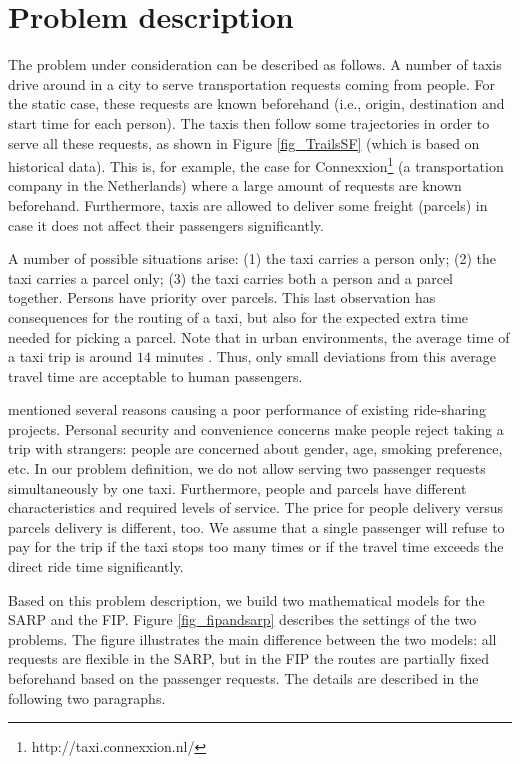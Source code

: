 \documentclass[preprint,authoryear,12pt]{elsarticle}
\begin{document}
\section{Problem description}\label{sec_problem}
The problem under consideration can be described as follows. A number of taxis drive around in a city to serve transportation requests coming from people. For the static case, these requests are known beforehand (i.e., origin, destination and start time for each person). The taxis then follow some trajectories in order to serve all these requests, as shown in Figure \ref{fig_TrailsSF} (which is based on historical data). This is, for example, the case for Connexxion\footnote{http://taxi.connexxion.nl/} (a transportation company in the Netherlands) where a large amount of requests are known beforehand. Furthermore, taxis are allowed to deliver some freight (parcels) in case it does not affect their passengers significantly. 

A number of possible situations arise: (1) the taxi carries a person only; (2) the taxi carries a parcel only; (3) the taxi carries both a person and a parcel together. Persons have priority over parcels. This last observation has consequences for the routing of a taxi, but also for the expected extra time needed for picking a parcel. Note that in urban environments, the average time of a taxi trip is around $14$ minutes \citep{TaxiSFOnline}. Thus, only small deviations from this average travel time are acceptable to human passengers. 

\cite{Kamar} mentioned several reasons causing a poor performance of existing ride-sharing projects. Personal security and convenience concerns make people reject taking a trip with strangers: people are concerned about gender, age, smoking preference, etc. In our problem definition, we do not allow serving two passenger requests simultaneously by one taxi. Furthermore, people and parcels have different characteristics and required levels of service. The price for people delivery versus parcels delivery is different, too. We assume that a single passenger will refuse to pay for the trip if the taxi stops too many times or if the travel time exceeds the direct ride time significantly.

Based on this problem description, we build two mathematical models for the SARP and the FIP. Figure \ref{fig_fipandsarp} describes the settings of the two problems. The figure illustrates the main difference between the two models: all requests are flexible in the SARP, but in the FIP the routes are partially fixed beforehand based on the passenger requests. The details are described in the following two paragraphs.
\end{document}
